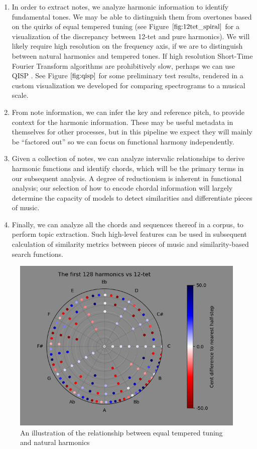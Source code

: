 \begin{enumerate}
    \item In order to extract notes, we analyze harmonic information to identify fundamental tones. We may be able to distinguish them from overtones based on the quirks of equal tempered tuning (see Figure $\ref{fig:12tet_spiral}$ for a visualization of the discrepancy between 12-tet and pure harmonics). We will likely require high resolution on the frequency axis, if we are to distinguish between natural harmonics and tempered tones. If high resolution Short-Time Fourier Transform algorithms are prohibitively slow, perhaps we can use QISP \cite{Smith2011}. See Figure $\ref{fig:qisp}$ for some preliminary test results, rendered in a custom visualization we developed for comparing spectrograms to a musical scale.
    \item From note information, we can infer the key and reference pitch, to provide context for the harmonic information. These may be useful metadata in themselves for other processes, but in this pipeline we expect they will mainly be ``factored out'' so we can focus on functional harmony independently.
    \item Given a collection of notes, we can analyze intervalic relationships to derive harmonic functions and identify chords, which will be the primary terms in our subsequent analysis. A degree of reductionism is inherent in functional analysis; our selection of how to encode chordal information will largely determine the capacity of models to detect similarities and differentiate pieces of music.
    \item Finally, we can analyze all the chords and sequences thereof in a corpus, to perform topic extraction. Such high-level features can be used in subsequent calculation of similarity metrics between pieces of music and similarity-based search functions.
\end{enumerate}

\begin{figure}[H]
    \centering
    \includegraphics[scale=0.67]{12tet_spiral.png}
    \caption{An illustration of the relationship between equal tempered tuning and natural harmonics}
    \label{fig:12tet_spiral}
\end{figure}

